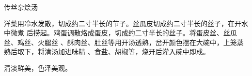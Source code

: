\begin{recipe}{传丝杂烩汤}

\ingredients


\preparation

洋菜用冷水发散，切成约二寸半长的节子。丝瓜皮切成约二寸半长的丝子，在开水中微煮
后捞起。鸡蛋调散烙成蛋皮，切成约二寸半长的丝子。将蛋皮丝、丝瓜丝、鸡丝、火腿丝
、酥肉丝、肚丝等用开汤透熟，岔开颜色摆在大碗中，上笼蒸熟后取下，将清汤加进味精
、食盐、胡椒等，烧开后灌入碗中即成。

\features

清淡鲜美，色泽美观。

\end{recipe}

